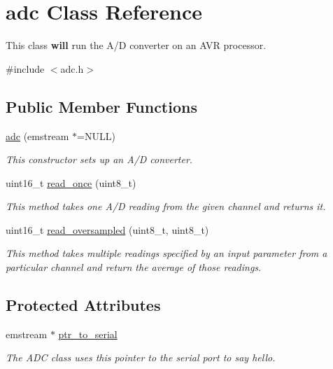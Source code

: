 \hypertarget{classadc}{
\section{adc Class Reference}
\label{classadc}
}


This class {\bfseries will} run the A/D converter on an AVR processor.  


{\ttfamily \#include $<$adc.h$>$}\subsection*{Public Member Functions}
\begin{DoxyCompactItemize}
\item 
\hyperlink{classadc_af3b8262c08f5fc5ae325a20622883424}{adc} (emstream $\ast$=NULL)
\begin{DoxyCompactList}\small\item\em This constructor sets up an A/D converter. \item\end{DoxyCompactList}\item 
uint16\_\-t \hyperlink{classadc_a2190a59696a7093e1ea605e998ccf97e}{read\_\-once} (uint8\_\-t)
\begin{DoxyCompactList}\small\item\em This method takes one A/D reading from the given channel and returns it. \item\end{DoxyCompactList}\item 
uint16\_\-t \hyperlink{classadc_a58f1030fe64d3dea4ccd8a2687dd6fce}{read\_\-oversampled} (uint8\_\-t, uint8\_\-t)
\begin{DoxyCompactList}\small\item\em This method takes multiple readings specified by an input parameter from a particular channel and return the average of those readings. \item\end{DoxyCompactList}\end{DoxyCompactItemize}
\subsection*{Protected Attributes}
\begin{DoxyCompactItemize}
\item 
\hypertarget{classadc_a14680b48b723bf1adddd2741ebb18a3e}{
emstream $\ast$ \hyperlink{classadc_a14680b48b723bf1adddd2741ebb18a3e}{ptr\_\-to\_\-serial}}
\label{classadc_a14680b48b723bf1adddd2741ebb18a3e}

\begin{DoxyCompactList}\small\item\em The ADC class uses this pointer to the serial port to say hello. \item\end{DoxyCompactList}\end{DoxyCompactItemize}


